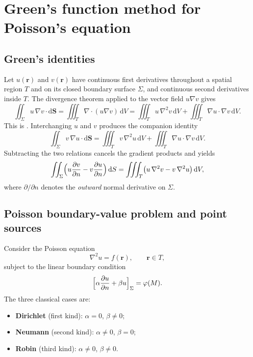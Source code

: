\section{Green's function method for Poisson's equation}

\subsection{Green's identities}

Let $u(\mathbf{r})$ and $v(\mathbf{r})$ have continuous first derivatives throughout a spatial region $T$ and on its closed boundary surface $\Sigma$, and continuous second derivatives inside $T$. The divergence theorem applied to the vector field $u\nabla v$ gives
\begin{equation}
\iint_{\Sigma} u\,\nabla v\cdot\mathrm{d}\mathbf{S}
=\iiint_{T}\nabla\cdot(u\nabla v)\,\mathrm{d}V
=\iiint_{T}u\,\nabla^2 v\,\mathrm{d}V
+\iiint_{T}\nabla u\cdot\nabla v\,\mathrm{d}V.
\end{equation}
This is . Interchanging $u$ and $v$ produces the companion identity
\begin{equation}
\iint_{\Sigma} v\,\nabla u\cdot\mathrm{d}\mathbf{S}
=\iiint_{T}v\,\nabla^2 u\,\mathrm{d}V
+\iiint_{T}\nabla u\cdot\nabla v\,\mathrm{d}V.
\end{equation}
Subtracting the two relations cancels the gradient products and yields 
\begin{equation}
\label{eq:green2}
\iint_{\Sigma}\Bigl(
u\frac{\partial v}{\partial n}-v\frac{\partial u}{\partial n}
\Bigr)\,\mathrm{d}S
=\iiint_{T}\bigl(u\,\nabla^2 v-v\,\nabla^2 u\bigr)\,\mathrm{d}V,
\end{equation}
where $\partial/\partial n$ denotes the \emph{outward} normal derivative on $\Sigma$.

\subsection{Poisson boundary-value problem and point sources}

Consider the Poisson equation
\begin{equation}
\label{eq:poisson}
\nabla^2 u=f(\mathbf{r}),\qquad\mathbf{r}\in T,
\end{equation}
subject to the linear boundary condition
\begin{equation}
\label{eq:bc-gen}
\Bigl[\alpha\frac{\partial u}{\partial n}+\beta u\Bigr]_{\Sigma}=\varphi(M).
\end{equation}
The three classical cases are:
\begin{itemize}
\item \textbf{Dirichlet} (first kind): $\alpha=0$, $\beta\neq0$;
\item \textbf{Neumann} (second kind): $\alpha\neq0$, $\beta=0$;
\item \textbf{Robin} (third kind): $\alpha\neq0$, $\beta\neq0$.
\end{itemize}


